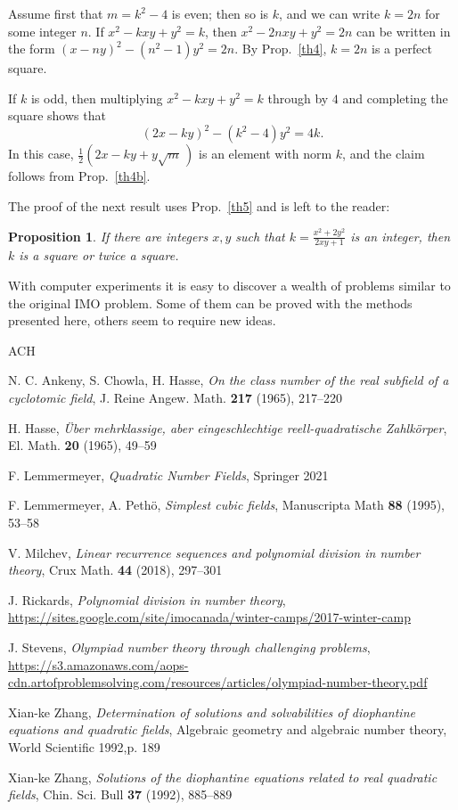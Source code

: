 \documentclass{amsart}
\newtheorem{prop}[lemma]{Proposition}
\begin{document}
Assume first that $m = k^2-4$ is even; then so is $k$, and we can write
$k = 2n$ for some integer $n$. If $x^2 - kxy + y^2 = k$, then
$x^2 - 2nxy + y^2 = 2n$ can be written in the form
$(x-ny)^2 - (n^2-1)y^2 = 2n$. By Prop.~\ref{th4}, $k = 2n$ is a
perfect square.

If $k$ is odd, then multiplying  $x^2 - kxy + y^2 = k$ through
by $4$ and completing the square shows that
$$ (2x - ky)^2 - (k^2-4)y^2 = 4k. $$
In this case, $\frac12(2x-ky+y\sqrt{m}\,)$ is an element with norm $k$,
and the claim follows from Prop.~\ref{th4b}.

The proof of the next result uses Prop.~\ref{th5} and is left to the reader:

\begin{prop}
  If there are integers $x, y$ such that $k = \frac{x^2 + 2y^2}{2xy+1}$ is
  an integer, then $k$ is a square or twice a square.
\end{prop}

With computer experiments it is easy to discover a wealth of
problems similar to the original IMO problem. Some of them can
be proved with the methods presented here, others seem to require
new ideas.

\begin{thebibliography}{ACH}

N. C. Ankeny, S. Chowla, H. Hasse, {\em On the class number of
the real subfield of a cyclotomic field}, J. Reine Angew. Math.
{\bf 217} (1965), 217--220
%

H. Hasse, {\em \"{U}ber mehrklassige, aber eingeschlechtige
reell-quadratische Zahlk\"{o}rper}, El. Math. {\bf 20} (1965), 49--59
%

 F. Lemmermeyer,
  {\em Quadratic Number Fields},
  Springer 2021
  
 F. Lemmermeyer, A. Peth\"o,
  {\em Simplest cubic fields},
  Manuscripta Math {\bf 88} (1995), 53--58

 V. Milchev,
  {\em Linear recurrence sequences and polynomial division in number theory},
  Crux Math. {\bf 44} (2018), 297--301
  
 J. Rickards,
  {\em Polynomial division in number theory}, \\
  \url{https://sites.google.com/site/imocanada/winter-camps/2017-winter-camp}

 J. Stevens,
  {\em Olympiad number theory through challenging problems}, \\
  \url{https://s3.amazonaws.com/aops-cdn.artofproblemsolving.com/resources/articles/olympiad-number-theory.pdf}
  
 Xian-ke Zhang,
  {\em Determination of solutions and solvabilities of
    diophantine equations and quadratic fields},
  Algebraic geometry and algebraic number theory,
  World Scientific 1992,p. 189

 Xian-ke Zhang,
  {\em Solutions of the diophantine equations related to real
    quadratic fields}, Chin. Sci. Bull {\bf 37} (1992), 885--889
  

\end{thebibliography}
\end{document}
